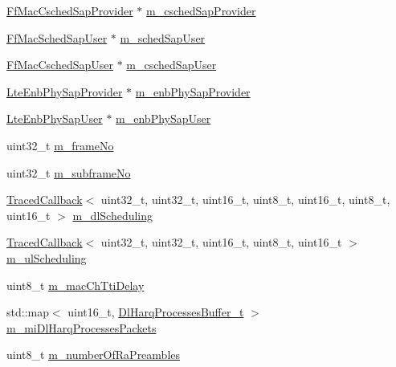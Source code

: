\begin{DoxyCompactItemize}
\item 
\hyperlink{classns3_1_1FfMacCschedSapProvider}{Ff\+Mac\+Csched\+Sap\+Provider} $\ast$ \hyperlink{classns3_1_1LteEnbMac_a0d1bd5af32f8b78f2c8ff493560d3fca}{m\+\_\+csched\+Sap\+Provider}
\item 
\hyperlink{classns3_1_1FfMacSchedSapUser}{Ff\+Mac\+Sched\+Sap\+User} $\ast$ \hyperlink{classns3_1_1LteEnbMac_a0b12a94bc3f8b8eb6403d403bca3a3f7}{m\+\_\+sched\+Sap\+User}
\item 
\hyperlink{classns3_1_1FfMacCschedSapUser}{Ff\+Mac\+Csched\+Sap\+User} $\ast$ \hyperlink{classns3_1_1LteEnbMac_a26026fbdde179ee1cef05db3969576bd}{m\+\_\+csched\+Sap\+User}
\item 
\hyperlink{classns3_1_1LteEnbPhySapProvider}{Lte\+Enb\+Phy\+Sap\+Provider} $\ast$ \hyperlink{classns3_1_1LteEnbMac_a1f4686da5350f6b70b6b966322c109fd}{m\+\_\+enb\+Phy\+Sap\+Provider}
\item 
\hyperlink{classns3_1_1LteEnbPhySapUser}{Lte\+Enb\+Phy\+Sap\+User} $\ast$ \hyperlink{classns3_1_1LteEnbMac_a5ebdfe8020efdb808653315b6d3c26ac}{m\+\_\+enb\+Phy\+Sap\+User}
\item 
uint32\+\_\+t \hyperlink{classns3_1_1LteEnbMac_a1ca20e5d0d321f28dc931bdcccadfada}{m\+\_\+frame\+No}
\item 
uint32\+\_\+t \hyperlink{classns3_1_1LteEnbMac_adccfd57ac8aedd1182963517546fde38}{m\+\_\+subframe\+No}
\item 
\hyperlink{classns3_1_1TracedCallback}{Traced\+Callback}$<$ uint32\+\_\+t, uint32\+\_\+t, uint16\+\_\+t, uint8\+\_\+t, uint16\+\_\+t, uint8\+\_\+t, uint16\+\_\+t $>$ \hyperlink{classns3_1_1LteEnbMac_a76fc41748a5422281aa4f3d2739512b5}{m\+\_\+dl\+Scheduling}
\item 
\hyperlink{classns3_1_1TracedCallback}{Traced\+Callback}$<$ uint32\+\_\+t, uint32\+\_\+t, uint16\+\_\+t, uint8\+\_\+t, uint16\+\_\+t $>$ \hyperlink{classns3_1_1LteEnbMac_aab6ec5d4fdeca697abea609fa10d7df5}{m\+\_\+ul\+Scheduling}
\item 
uint8\+\_\+t \hyperlink{classns3_1_1LteEnbMac_a931e5e94323309225b902f9ce78bf1af}{m\+\_\+mac\+Ch\+Tti\+Delay}
\item 
std\+::map$<$ uint16\+\_\+t, \hyperlink{namespacens3_aa3c4d208d1d07a2cfcf9c09e4ae4c5af}{Dl\+Harq\+Processes\+Buffer\+\_\+t} $>$ \hyperlink{classns3_1_1LteEnbMac_aaf60e2fb6f8326eeebbdec6b7e7054da}{m\+\_\+mi\+Dl\+Harq\+Processes\+Packets}
\item 
uint8\+\_\+t \hyperlink{classns3_1_1LteEnbMac_aa907c42f35e48b0c3cba70d645685342}{m\+\_\+number\+Of\+Ra\+Preambles}
\item 

\end{DoxyCompactItemize}

